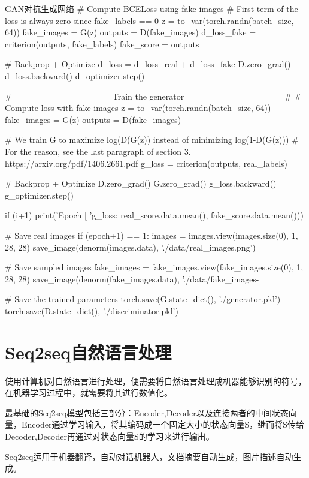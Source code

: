 \documentclass[openbib]{article}
\begin{document}
\begin{Python}{GAN对抗生成网络}
# Compute BCELoss using fake images
# First term of the loss is always zero since fake_labels == 0
z = to_var(torch.randn(batch_size, 64))
fake_images = G(z)
outputs = D(fake_images)
d_loss_fake = criterion(outputs, fake_labels)
fake_score = outputs

# Backprop + Optimize
d_loss = d_loss_real + d_loss_fake
D.zero_grad()
d_loss.backward()
d_optimizer.step()

#=============== Train the generator ===============#
# Compute loss with fake images
z = to_var(torch.randn(batch_size, 64))
fake_images = G(z)
outputs = D(fake_images)

# We train G to maximize log(D(G(z)) instead of minimizing log(1-D(G(z)))
# For the reason, see the last paragraph of section 3. https://arxiv.org/pdf/1406.2661.pdf
g_loss = criterion(outputs, real_labels)

# Backprop + Optimize
D.zero_grad()
G.zero_grad()
g_loss.backward()
g_optimizer.step()

if (i+1) %
	print('Epoch [%
	'g_loss: %
	real_score.data.mean(), fake_score.data.mean()))

# Save real images
if (epoch+1) == 1:
	images = images.view(images.size(0), 1, 28, 28)
	save_image(denorm(images.data), './data/real_images.png')

# Save sampled images
fake_images = fake_images.view(fake_images.size(0), 1, 28, 28)
save_image(denorm(fake_images.data), './data/fake_images-%

# Save the trained parameters 
torch.save(G.state_dict(), './generator.pkl')
torch.save(D.state_dict(), './discriminator.pkl')
\end{Python}
\section{Seq2seq自然语言处理}

使用计算机对自然语言进行处理，便需要将自然语言处理成机器能够识别的符号，在机器学习过程中，就需要将其进行数值化。

最基础的Seq2seq模型包括三部分：Encoder,Decoder以及连接两者的中间状态向量，Encoder通过学习输入，将其编码成一个固定大小的状态向量S，继而将S传给Decoder,Decoder再通过对状态向量S的学习来进行输出。

Seq2seq运用于机器翻译，自动对话机器人，文档摘要自动生成，图片描述自动生成。
\end{document}
